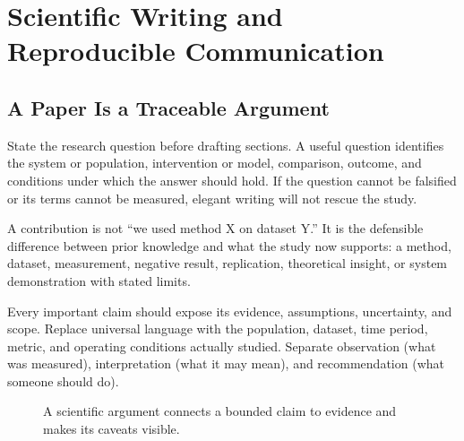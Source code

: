 \chapter{Scientific Writing and Reproducible Communication}
\label{ch:scientific-writing}

\section{A Paper Is a Traceable Argument}

\begin{tcbitemize}[skin=sectionraster]
\tcbitem[title={Question Before Prose},raster multicolumn=3]
State the research question before drafting sections.
A useful question identifies the system or population, intervention or model,
comparison, outcome, and conditions under which the answer should hold.
If the question cannot be falsified or its terms cannot be measured, elegant
writing will not rescue the study.

\tcbitem[title={Contribution Is a Difference},raster multicolumn=3]
A contribution is not ``we used method X on dataset Y.''
It is the defensible difference between prior knowledge and what the study now
supports: a method, dataset, measurement, negative result, replication,
theoretical insight, or system demonstration with stated limits.

\tcbitem[title={Claims Have Boundaries},raster multicolumn=6]
Every important claim should expose its evidence, assumptions, uncertainty,
and scope.
Replace universal language with the population, dataset, time period, metric,
and operating conditions actually studied.
Separate observation (what was measured), interpretation (what it may mean),
and recommendation (what someone should do).
\end{tcbitemize}

\begin{figure}[htbp]
\centering
{}
\caption{A scientific argument connects a bounded claim to evidence and makes
its caveats visible.}
\label{fig:scientific-claim-evidence-caveat}
\end{figure}

